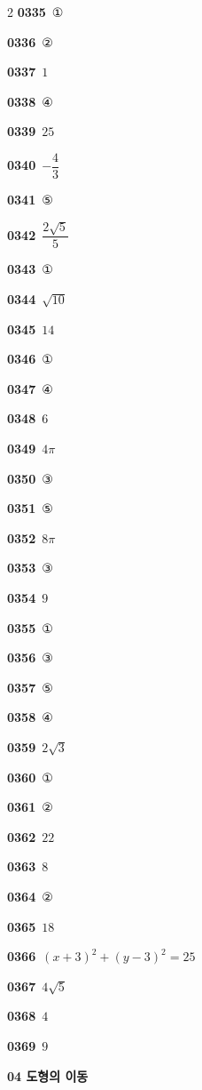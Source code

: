 \documentclass[10pt,a4paper]{article}
\begin{document}
\begin{multicols}{2}
\noindent\textbf{0335}\ ①\par
\noindent\textbf{0336}\ ②\par
\noindent\textbf{0337}\ $1$\par
\noindent\textbf{0338}\ ④\par
\noindent\textbf{0339}\ $25$\par
\noindent\textbf{0340}\ $-\dfrac{4}{3}$\par
\noindent\textbf{0341}\ ⑤\par
\noindent\textbf{0342}\ $\dfrac{2\sqrt{5}}{5}$\par
\noindent\textbf{0343}\ ①\par
\noindent\textbf{0344}\ $\sqrt{10}$\par
\noindent\textbf{0345}\ $14$\par
\noindent\textbf{0346}\ ①\par
\noindent\textbf{0347}\ ④\par
\noindent\textbf{0348}\ $6$\par
\noindent\textbf{0349}\ $4\pi$\par
\noindent\textbf{0350}\ ③\par
\noindent\textbf{0351}\ ⑤\par
\noindent\textbf{0352}\ $8\pi$\par
\noindent\textbf{0353}\ ③\par
\noindent\textbf{0354}\ $9$\par
\noindent\textbf{0355}\ ①\par
\noindent\textbf{0356}\ ③\par
\noindent\textbf{0357}\ ⑤\par
\noindent\textbf{0358}\ ④\par
\noindent\textbf{0359}\ $2\sqrt{3}$\par
\noindent\textbf{0360}\ ①\par
\noindent\textbf{0361}\ ②\par
\noindent\textbf{0362}\ $22$\par
\noindent\textbf{0363}\ $8$\par
\noindent\textbf{0364}\ ②\par
\noindent\textbf{0365}\ $18$\par
\noindent\textbf{0366}\ $(x+3)^2+(y-3)^2=25$\par
\noindent\textbf{0367}\ $4\sqrt{5}$\par
\noindent\textbf{0368}\ $4$\par
\noindent\textbf{0369}\ $9$\par
\noindent\textbf{04 도형의 이동}\par\smallskip

\end{multicols}
\end{document}
